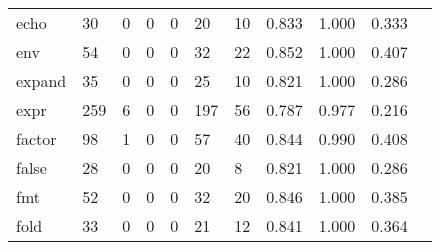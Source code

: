 \begin{longtable}{lp{1.10cm}p{1.10cm}p{1.10cm}p{1.10cm}p{1.10cm}p{1.10cm}p{1.10cm}p{1.10cm}p{1.10cm}p{1.10cm}}
echo      &                     30 &                                  0 &                                 0 &                                0 &                                20 &                              10 &                          0.833 &                                 1.000 &                               0.333 \\
env       &                     54 &                                  0 &                                 0 &                                0 &                                32 &                              22 &                          0.852 &                                 1.000 &                               0.407 \\
expand    &                     35 &                                  0 &                                 0 &                                0 &                                25 &                              10 &                          0.821 &                                 1.000 &                               0.286 \\
expr      &                    259 &                                  6 &                                 0 &                                0 &                               197 &                              56 &                          0.787 &                                 0.977 &                               0.216 \\
factor    &                     98 &                                  1 &                                 0 &                                0 &                                57 &                              40 &                          0.844 &                                 0.990 &                               0.408 \\
false     &                     28 &                                  0 &                                 0 &                                0 &                                20 &                               8 &                          0.821 &                                 1.000 &                               0.286 \\
fmt       &                     52 &                                  0 &                                 0 &                                0 &                                32 &                              20 &                          0.846 &                                 1.000 &                               0.385 \\
fold      &                     33 &                                  0 &                                 0 &                                0 &                                21 &                              12 &                          0.841 &                                 1.000 &                               0.364 \\

\end{longtable}
